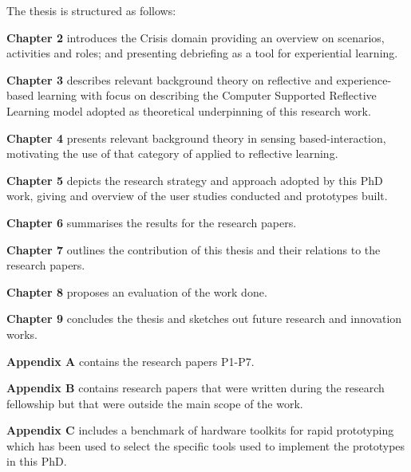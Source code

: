 The thesis is structured as follows:

\textbf{Chapter 2} introduces the Crisis domain providing an overview on
scenarios, activities and roles; and presenting debriefing as a tool for
experiential learning.

\textbf{Chapter 3} describes relevant background theory on reflective
and experience-based learning with focus on describing the Computer
Supported Reflective Learning model adopted as theoretical underpinning
of this research work.

\textbf{Chapter 4} presents relevant background theory in sensing
based-interaction, motivating the use of that category of applied to
reflective learning.

\textbf{Chapter 5} depicts the research strategy and approach adopted by
this PhD work, giving and overview of the user studies conducted and
prototypes built.

\textbf{Chapter 6} summarises the results for the research papers.

\textbf{Chapter 7} outlines the contribution of this thesis and their
relations to the research papers.

\textbf{Chapter 8} proposes an evaluation of the work done.

\textbf{Chapter 9} concludes the thesis and sketches out future research
and innovation works.

\textbf{Appendix A} contains the research papers P1-P7.

\textbf{Appendix B} contains research papers that were written during
the research fellowship but that were outside the main scope of the
work.

\textbf{Appendix C} includes a benchmark of hardware toolkits for rapid
prototyping which has been used to select the specific tools used to
implement the prototypes in this PhD.
